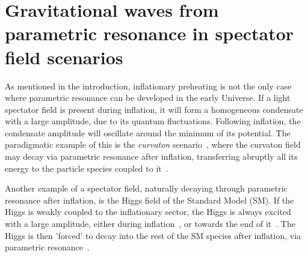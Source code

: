 \documentclass[a4paper,11pt]{article}
\begin{document}
 \section{Gravitational waves from parametric resonance in spectator field scenarios}\label{sec:SubFields}

As mentioned in the introduction, inflationary preheating is not the only case where parametric resonance can be developed in the early Universe. If a light spectator field is present during inflation, it will form a homogeneous condensate with a large amplitude, due to its quantum fluctuations. Following inflation, the condensate amplitude will oscillate around the minimum of its potential. The paradigmatic example of this is the {\it curvaton} scenario~\cite{Enqvist:2001zp,Lyth:2001nq,Moroi:2001ct,Mazumdar:2010sa}, where the curvaton field may decay via parametric resonance after inflation, transferring abruptly all its energy to the particle species coupled to it~\cite{Enqvist:2008be, Enqvist:2012tc, Enqvist:2013qba, Enqvist:2013gwf}. 

Another example of a spectator field, naturally decaying through parametric resonance after inflation, is the Higgs field of the Standard Model (SM). If the Higgs is weakly coupled to the inflationary sector, the Higgs is always excited with a large amplitude, either during inflation~\cite{Starobinsky:1994bd,Enqvist:2013kaa,DeSimone:2012qr}, or towards the end of it~\cite{Herranen:2015ima,Figueroa:2016dsc}. The Higgs is then 'forced' to decay into the rest of the SM species after inflation, via parametric resonance~\cite{Enqvist:2013kaa,Enqvist:2014tta,Figueroa:2014aya,Kusenko:2014lra,Figueroa:2015rqa,Enqvist:2015sua,Figueroa:2016dsc}. 
\end{document}
